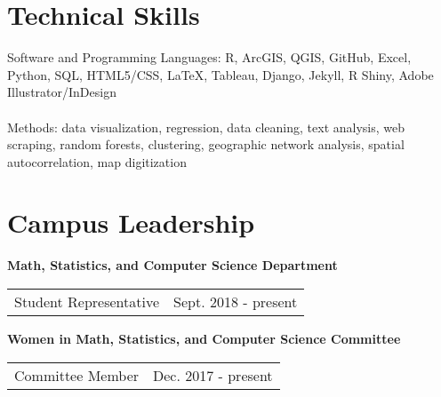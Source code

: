 \section{\sc Technical Skills}
Software and Programming Languages: R, ArcGIS, QGIS, GitHub, Excel, Python, SQL, HTML5/CSS, LaTeX, Tableau, Django, Jekyll, R Shiny, Adobe Illustrator/InDesign\\
\\
Methods: data visualization, regression, data cleaning, text analysis, web scraping,  random forests, clustering, geographic network analysis, spatial autocorrelation, map digitization

\section{\sc Campus Leadership}
{\bf{Math, Statistics, and Computer Science Department}}\\
\begin{tabular}{@{}p{4in}p{2in}}
Student Representative & Sept. 2018 - present\\
\end{tabular}
{\bf{Women in Math, Statistics, and Computer Science Committee}}\\
\begin{tabular}{@{}p{4in}p{2in}}
Committee Member & Dec. 2017 - present\\
\end{tabular}
\endinput

